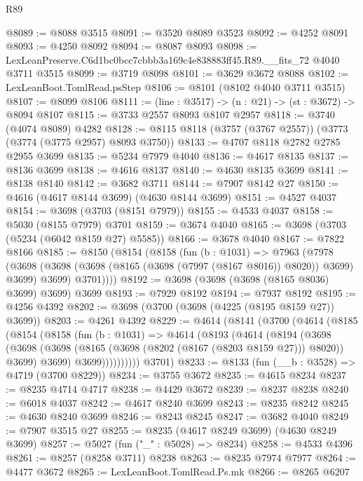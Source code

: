 \begin{lexlean}{R89}
\begin{coremodule}
@8089 := @8088 @3515
@8091 := @3520 @8089 @3523
@8092 := @4252 @8091
@8093 := @4250 @8092
@8094 := @8087 @8093
@8098 := LexLeanPreserve.C6d1bc0bcc7cbbb3a169c4e838883ff45.R89.__fits_72 @4040 @3711 @3515
@8099 := @3719 @8098
@8101 := @3629 @3672 @8088
@8102 := LexLeanBoot.TomlRead.psStep
@8106 := @8101 (@8102 @4040 @3711 @3515)
@8107 := @8099 @8106
@8111 := (line : @3517) -> (n : @21) -> (st : @3672) -> @8094 @8107
@8115 := @3733 @2557 @8093 @8107 @2957
@8118 := @3740 (@4074 @8089) @4282
@8128 := @8115 @8118 (@3757 (@3767 @2557)) (@3773 (@3774 (@3775 @2957) @8093 @3750))
@8133 := @4707 @8118 @2782 @2785 @2955 @3699
@8135 := @5234 @7979 @4040
@8136 := @4617 @8135
@8137 := @8136 @3699
@8138 := @4616 @8137
@8140 := @4630 @8135 @3699
@8141 := @8138 @8140
@8142 := @3682 @3711
@8144 := @7907 @8142 @27
@8150 := @4616 (@4617 @8144 @3699) (@4630 @8144 @3699)
@8151 := @4527 @4037
@8154 := @3698 (@3703 (@8151 @7979))
@8155 := @4533 @4037
@8158 := @5030 (@8155 @7979) @3701
@8159 := @3674 @4040
@8165 := @3698 (@3703 (@5234 (@6042 @8159 @27) @5585))
@8166 := @3678 @4040
@8167 := @7822 @8166
@8185 := @8150
    (@8154
      (@8158
        (fun (b : @1031) =>
        @7963
          (@7978
            (@3698 (@3698 (@3698 (@8165 (@3698 (@7997 (@8167 @8016)) @8020)) @3699) @3699) @3699)
            @3701))))
@8192 := @3698 (@3698 (@3698 (@8165 @8036) @3699) @3699) @3699
@8193 := @7929 @8192
@8194 := @7937 @8192
@8195 := @4256 @4392
@8202 := @3698 (@3700 (@3698 (@4225 (@8195 @8159 @27)) @3699))
@8203 := @4261 @4392
@8229 := @4614
    (@8141
      (@3700
        (@4614
          (@8185
            (@8154
              (@8158
                (fun (b : @1031) =>
                @4614
                  (@8193
                    (@4614
                      (@8194
                        (@3698
                          (@3698
                            (@3698 (@8165 (@3698 (@8202 (@8167 (@8203 @8159 @27))) @8020)) @3699)
                            @3699)
                          @3699))))))))))
      @3701)
@8233 := @8133 (fun (__b : @3528) => @4719 (@3700 @8229))
@8234 := @3755 @3672
@8235 := @4615 @8234
@8237 := @8235 @4714 @4717
@8238 := @4429 @3672
@8239 := @8237 @8238
@8240 := @6018 @4037
@8242 := @4617 @8240 @3699
@8243 := @8235 @8242
@8245 := @4630 @8240 @3699
@8246 := @8243 @8245
@8247 := @3682 @4040
@8249 := @7907 @3515 @27
@8255 := @8235 (@4617 @8249 @3699) (@4630 @8249 @3699)
@8257 := @5027 (fun ("_" : @5028) => @8234)
@8258 := @4533 @4396
@8261 := @8257 (@8258 @3711) @8238
@8263 := @8235 @7974 @7977
@8264 := @4477 @3672
@8265 := LexLeanBoot.TomlRead.Ps.mk
@8266 := @8265 @6207

\end{coremodule}
\end{lexlean}
